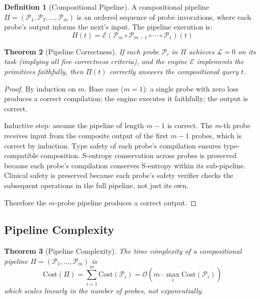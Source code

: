 \documentclass[11pt,twocolumn,a4paper]{article}
\newtheorem{theorem}{Theorem}[section]
\theoremstyle{definition}
\newtheorem{definition}[theorem]{Definition}
\theoremstyle{remark}
\newcommand{\loss}{\mathcal{L}}
\newcommand{\probe}{\mathcal{P}}
\newcommand{\engine}{\mathcal{E}}
\begin{document}
\begin{definition}[Compositional Pipeline]
\label{def:comp_pipeline}
A compositional pipeline $\Pi = (\probe_1, \probe_2, \ldots, \probe_m)$ is an ordered sequence of probe invocations, where each probe's output informs the next's input. The pipeline execution is:
\begin{equation}
\Pi(t) = \engine(\probe_m \circ \probe_{m-1} \circ \cdots \circ \probe_1)(t)
\end{equation}
\end{definition}

\begin{theorem}[Pipeline Correctness]
\label{thm:pipeline_correctness}
If each probe $\probe_i$ in $\Pi$ achieves $\loss = 0$ on its task (implying all five correctness criteria), and the engine $\engine$ implements the primitives faithfully, then $\Pi(t)$ correctly answers the compositional query $t$.
\end{theorem}

\begin{proof}
By induction on $m$. Base case ($m=1$): a single probe with zero loss produces a correct compilation; the engine executes it faithfully; the output is correct.

Inductive step: assume the pipeline of length $m-1$ is correct. The $m$-th probe receives input from the composite output of the first $m-1$ probes, which is correct by induction. Type safety of each probe's compilation ensures type-compatible composition. S-entropy conservation across probes is preserved because each probe's compilation conserves S-entropy within its sub-pipeline. Clinical safety is preserved because each probe's safety verifier checks the subsequent operations in the full pipeline, not just its own.

Therefore the $m$-probe pipeline produces a correct output.
\end{proof}

\subsection{Pipeline Complexity}

\begin{theorem}[Pipeline Complexity]
\label{thm:pipeline_complexity}
The time complexity of a compositional pipeline $\Pi = (\probe_1, \ldots, \probe_m)$ is
\begin{equation}
\text{Cost}(\Pi) = \sum_{i=1}^m \text{Cost}(\probe_i) = \mathcal{O}(m \cdot \max_i \text{Cost}(\probe_i))
\end{equation}
which scales linearly in the number of probes, not exponentially.
\end{theorem}
\end{document}

